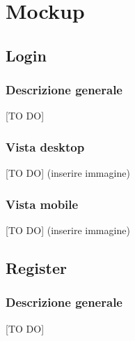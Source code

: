 %
%

\appendix


\section{Mockup} %
\label{sec:mockup}
	\subsection{Login} %
	\label{sub:login}
		\subsubsection{Descrizione generale} %
		[TO DO]

		\subsubsection{Vista desktop} %
		[TO DO] (inserire immagine)

		\subsubsection{Vista mobile} %
		[TO DO] (inserire immagine)

	\subsection{Register} %
	\label{sub:register}
		\subsubsection{Descrizione generale} %
		[TO DO]

